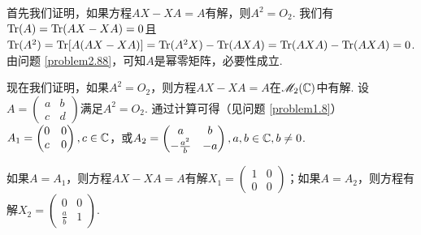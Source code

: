 \begin{solution}
  首先我们证明，如果方程$AX-XA=A$有解，则$A^2=O_2$. 我们有$\operatorname{Tr}(A)=\operatorname{Tr}(AX-XA)=0$且$\operatorname{Tr}(A^2)=\operatorname{Tr}[A(AX-XA)]
  =\operatorname{Tr}(A^2X)-\operatorname{Tr}(AXA)=\operatorname{Tr}(AXA)-\operatorname{Tr}(AXA)=0$. 由问题 \ref{problem2.88}，可知$A$是幂零矩阵，必要性成立.

  现在我们证明，如果$A^2=O_2$，则方程$AX-XA=A$在$\mathscr M_2(\mathbb C)$中有解. 设$A=\begin{pmatrix}
    a & b \\
    c & d
  \end{pmatrix}$满足$A^2=O_2$. 通过计算可得（见问题 \ref{problem1.8}）$A_1=\begin{pmatrix}
    0 & 0 \\
    c & 0
  \end{pmatrix},c\in\mathbb C$，或$A_2=\begin{pmatrix}
    a & b \\
    -\frac{a^2}b & - a
  \end{pmatrix},a,b\in\mathbb C,b\ne0$.

  如果$A=A_1$，则方程$AX-XA=A$有解$X_1=\begin{pmatrix}
    1 & 0 \\
    0 & 0
  \end{pmatrix}$；如果$A=A_2$，则方程有解$X_2=\begin{pmatrix}
    0 & 0 \\
    \frac ab & 1
  \end{pmatrix}$.
\end{solution}

\setcounter{solution}{95}

